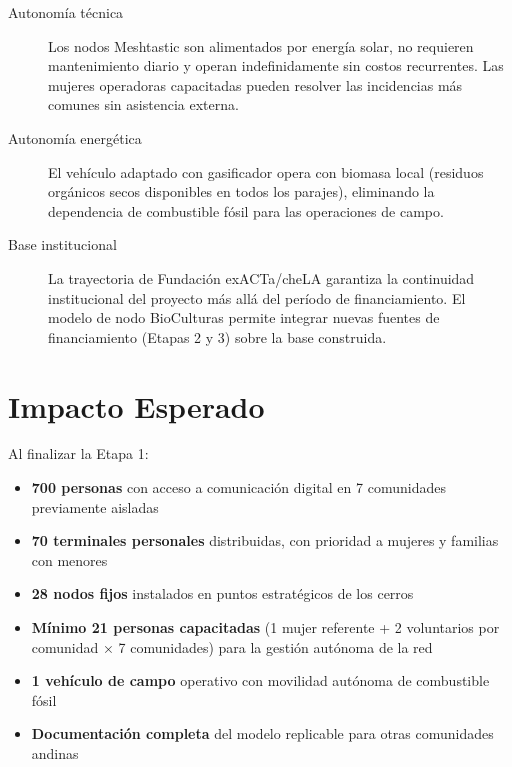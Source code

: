 \documentclass[12pt,a4paper]{article}
\begin{document}
\begin{description}
  \item[Autonomía técnica] Los nodos Meshtastic son alimentados por energía solar, no requieren mantenimiento diario y operan indefinidamente sin costos recurrentes. Las mujeres operadoras capacitadas pueden resolver las incidencias más comunes sin asistencia externa.

  \item[Autonomía energética] El vehículo adaptado con gasificador opera con biomasa local (residuos orgánicos secos disponibles en todos los parajes), eliminando la dependencia de combustible fósil para las operaciones de campo.

  \item[Base institucional] La trayectoria de Fundación exACTa/cheLA garantiza la continuidad institucional del proyecto más allá del período de financiamiento. El modelo de nodo BioCulturas permite integrar nuevas fuentes de financiamiento (Etapas 2 y 3) sobre la base construida.
\end{description}

\section{Impacto Esperado}

Al finalizar la Etapa 1:

\begin{itemize}
  \item \textbf{700 personas} con acceso a comunicación digital en 7 comunidades previamente aisladas
  \item \textbf{70 terminales personales} distribuidas, con prioridad a mujeres y familias con menores
  \item \textbf{28 nodos fijos} instalados en puntos estratégicos de los cerros
  \item \textbf{Mínimo 21 personas capacitadas} (1 mujer referente + 2 voluntarios por comunidad × 7 comunidades) para la gestión autónoma de la red
  \item \textbf{1 vehículo de campo} operativo con movilidad autónoma de combustible fósil
  \item \textbf{Documentación completa} del modelo replicable para otras comunidades andinas

\end{itemize}
\end{document}
